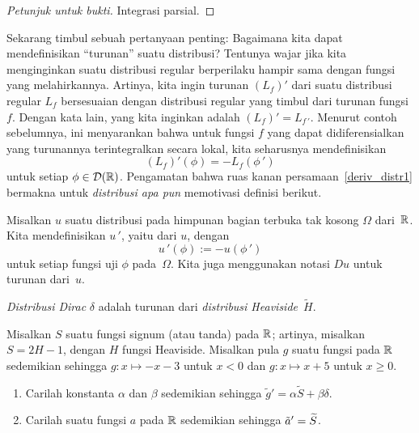 \begin{proof}[\emph{Petunjuk untuk bukti}] Integrasi parsial. \ns
\end{proof}

Sekarang timbul sebuah pertanyaan penting: Bagaimana kita dapat mendefinisikan ``turunan'' suatu distribusi? Tentunya wajar jika kita menginginkan suatu
distribusi regular berperilaku hampir sama dengan fungsi yang melahirkannya. Artinya, kita ingin turunan $(L_f)'$ dari
suatu distribusi regular $L_f$ bersesuaian dengan distribusi regular yang timbul dari turunan fungsi~$f$. Dengan kata lain,
yang kita inginkan adalah $(L_f)' = L_{f\,'}$. Menurut contoh sebelumnya, ini menyarankan bahwa untuk fungsi $f$ yang dapat didiferensialkan
yang turunannya terintegralkan secara lokal, kita seharusnya mendefinisikan
   \begin{equation}\label{deriv_distr1}
        (L_f)'(\phi) = -L_f(\phi\,')
   \end{equation}
untuk setiap $\phi \in \mathcal{D}(\mathbb{R})$. Pengamatan bahwa ruas kanan persamaan~\eqref{deriv_distr1} bermakna untuk
\emph{distribusi apa pun} memotivasi definisi berikut.

\begin{defn}\label{def_deriv_distr} Misalkan $u$ suatu distribusi pada himpunan bagian terbuka tak kosong $\Omega$ dari~$\mathbb{R}$. Kita mendefinisikan $u\,'$, yaitu
 dari $u$,
dengan
    \[ u\,'(\phi) := -u(\phi\,') \]
untuk setiap fungsi uji $\phi$ pada~$\Omega$. Kita juga menggunakan notasi $Du$ untuk turunan dari~$u$.
\end{defn}

\begin{exam} \emph{Distribusi Dirac} $\delta$ adalah turunan dari \emph{distribusi Heaviside}~$\widetilde H$.
\end{exam}

\begin{exer} Misalkan $S$ suatu fungsi signum (atau tanda) pada $\mathbb{R}$; artinya, misalkan $S = 2H - 1$, dengan $H$ fungsi Heaviside.
Misalkan pula $g$ suatu fungsi pada $\mathbb{R}$ sedemikian sehingga $g\colon x \mapsto -x - 3$ untuk $x < 0$ dan $g\colon x \mapsto x + 5$ untuk $x \ge 0$.
   \begin{enumerate}[label=\rm{(\alph*)}]
     \item Carilah konstanta $\alpha$ dan $\beta$ sedemikian sehingga ${\tilde g}' = \alpha \widetilde S + \beta \delta$.
     \item Carilah suatu fungsi $a$ pada $\mathbb{R}$ sedemikian sehingga ${\tilde a}' = \widetilde{S}$.
   \end{enumerate}
\end{exer}

